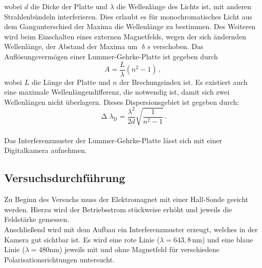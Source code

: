wobei $d$ die Dicke der Platte und $\lambda$ die Wellenlänge des Lichts ist, mit anderen Strahlenbündeln interferieren. Dies erlaubt es für monochromatisches Licht aus dem Gangunterschied der Maxima die Wellenlänge zu bestimmen. Des Weiteren wird beim Einschalten eines externen Magnetfelds, wegen der sich ändernden Wellenlänge, der Abstand der Maxima um $\updelta s$ verschoben.
Das Auflösungsvermögen einer Lummer-Gehrke-Platte ist gegeben durch
\begin{equation}
A=\frac{L}{\lambda}\left(n^2-1\right)\,,
\label{eq:auf}
\end{equation}
wobei $L$ die Länge der Platte und $n$ der Brechungsindex ist. Es existiert auch eine maximale Wellenlängendifferenz, die notwendig ist, damit sich zwei Wellenlängen nicht überlagern. Dieses Dispersionsgebiet ist gegeben durch:
\begin{equation}
\upDelta \lambda_\text{D}=\frac{\lambda^2}{2d}\sqrt{\frac{1}{n^2-1}}\,.
\label{eq:disp}
\end{equation}\\
Das Interferenzmuster der Lummer-Gehrke-Platte lässt sich mit einer Digitalkamera aufnehmen.
\subsection{Versuchsdurchführung}
Zu Beginn des Versuchs muss der Elektromagnet mit einer Hall-Sonde geeicht werden. Hierzu wird der Betriebsstrom stückweise erhöht und jeweils die Feldstärke gemessen.\\
Anschließend wird mit dem Aufbau ein Interferenzmuster erzeugt, welches in der Kamera gut sichtbar ist. Es wird eine rote Linie ($\lambda=643{,}8\,\si{\nm}$) und eine blaue Linie ($\lambda=480\si{\nm}$) jeweils mit und ohne Magnetfeld für verschiedene Polarisationsrichtungen untersucht.
